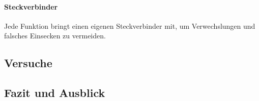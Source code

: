 \documentclass[main.tex]{subfiles} %
\begin{document}
\paragraph{Steckverbinder}
Jede Funktion bringt einen eigenen Steckverbinder mit, um Verwechslungen und
falsches Einsecken zu vermeiden.

\subsection*{Versuche}

\subsection*{Fazit und Ausblick}

\end{document}
